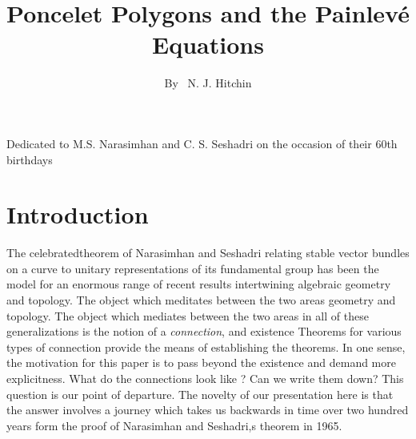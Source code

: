 \title{Poncelet Polygons and the Painlev\'e Equations}

\author{By~ N. J. Hitchin}

\date{}
\maketitle

\begin{center}
Dedicated to M.S. Narasimhan and C. S. Seshadri on the occasion of their 60th birthdays
\end{center}

\section{Introduction}\label{art7-sec-1}
The celebrated\pageoriginale theorem of Narasimhan and Seshadri \cite{art7-key13} relating stable vector bundles on a curve to unitary representations of its fundamental group has been the model for an enormous range of recent results intertwining algebraic geometry and topology. The object which meditates between the two areas geometry and topology. The object which mediates between the two areas in all of these generalizations is the notion of a \textit{connection}, and existence Theorems for various types of connection provide the means of establishing the theorems. In one sense, the motivation for this paper is to pass beyond the existence and demand more explicitness. What do the connections look like ? Can we write them down? This question is our point of departure. The novelty of our presentation here is that the answer involves a journey which takes us backwards in time over two hundred years form the proof of Narasimhan and Seshadri,s theorem in 1965.

